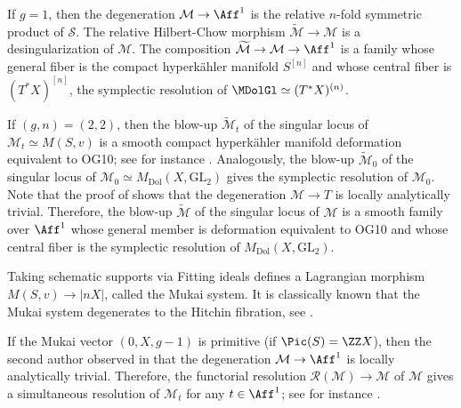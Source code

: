 \begin{exa} If $g=1$, then the degeneration $\mathcal{M}\to \Aff^1$ is the relative $n$-fold symmetric product of $\mathcal{S}$. The relative Hilbert-Chow morphism $\widetilde{\mathcal{M}}\to \mathcal{M}$ is a desingularization of $\mathcal{M}$. The composition $\widetilde{\mathcal{M}}\to \mathcal{M} \to \Aff^1$ is a family whose general fiber is the compact hyperkähler manifold $S^{[n]}$ and whose central fiber is $(T^*X)^{[n]}$, \ie the symplectic resolution of $\MDolGl \simeq (T^*X)^{(n)}$.
\end{exa}

\begin{exa}\label{ex:OGrady10} If $(g,n)=(2,2)$, then the blow-up $\widetilde{\mathcal{M}}_t$ of the singular locus of $\mathcal{M}_t \simeq M(S,v)$ is a smooth compact hyperkähler manifold deformation equivalent to OG10; see for instance \cite{PeregoRapagnetta13}. Analogously, the blow-up $\widetilde{\mathcal{M}}_0$ of the singular locus of $\mathcal{M}_0 \simeq M_{\mathrm{Dol}}(X, \mathrm{GL}_2)$ gives the symplectic resolution of $\mathcal{M}_0$. Note that the proof of \cite[Prop.\,2.16]{PeregoRapagnetta13} shows that the degeneration $\mathcal{M}\to T$ is locally analytically trivial. Therefore, the blow-up $\widetilde{\mathcal{M}}$ of the singular locus of $\mathcal{M}$ is a smooth family over $\Aff^1$ whose general member is deformation equivalent to OG10 and whose central fiber is the symplectic resolution of $M_{\mathrm{Dol}}(X, \mathrm{GL}_2)$.
\end{exa}

\begin{rmk}\label{rmk:DEL}
Taking schematic supports via Fitting ideals defines a Lagrangian morphism $M(S, v) \to |nX|$, called the Mukai system. It is classically known that the Mukai system degenerates to the Hitchin fibration, see \cite{DEL97}.
\end{rmk}

\begin{rmk}
If the Mukai vector $(0, X, g-1)$ is primitive (\eg if $\Pic(S) = \ZZ X$), then the second author observed in \cite[Rem.\,2.5]{Mauri2021} that the degeneration $\mathcal{M}\to \Aff^1$ is locally analytically trivial. Therefore, the functorial resolution $\mathcal{R}(\mathcal{M}) \to \mathcal{M}$ of $\mathcal{M}$ gives a simultaneous resolution of $\mathcal{M}_{t}$ for any $t \in \Aff^1$; see for instance \cite[Lem.\,4.2]{Graf}.
\end{rmk}


